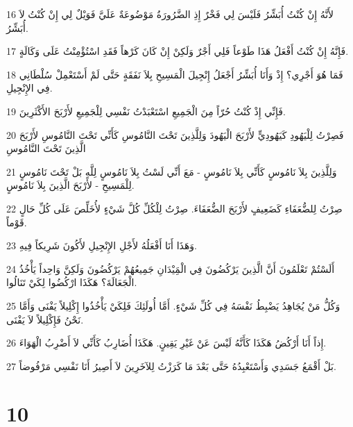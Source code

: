 \par 16 لأَنَّهُ إِنْ كُنْتُ أُبَشِّرُ فَلَيْسَ لِي فَخْرٌ إِذِ الضَّرُورَةُ مَوْضُوعَةٌ عَلَيَّ فَوَيْلٌ لِي إِنْ كُنْتُ لاَ أُبَشِّرُ.
\par 17 فَإِنَّهُ إِنْ كُنْتُ أَفْعَلُ هَذَا طَوْعاً فَلِي أَجْرٌ وَلَكِنْ إِنْ كَانَ كَرْهاً فَقَدِ اسْتُؤْمِنْتُ عَلَى وَكَالَةٍ.
\par 18 فَمَا هُوَ أَجْرِي؟ إِذْ وَأَنَا أُبَشِّرُ أَجْعَلُ إِنْجِيلَ الْمَسِيحِ بِلاَ نَفَقَةٍ حَتَّى لَمْ أَسْتَعْمِلْ سُلْطَانِي فِي الإِنْجِيلِ.
\par 19 فَإِنِّي إِذْ كُنْتُ حُرّاً مِنَ الْجَمِيعِ اسْتَعْبَدْتُ نَفْسِي لِلْجَمِيعِ لأَرْبَحَ الأَكْثَرِينَ.
\par 20 فَصِرْتُ لِلْيَهُودِ كَيَهُودِيٍّ لأَرْبَحَ الْيَهُودَ وَلِلَّذِينَ تَحْتَ النَّامُوسِ كَأَنِّي تَحْتَ النَّامُوسِ لأَرْبَحَ الَّذِينَ تَحْتَ النَّامُوسِ
\par 21 وَلِلَّذِينَ بِلاَ نَامُوسٍ كَأَنِّي بِلاَ نَامُوسٍ - مَعَ أَنِّي لَسْتُ بِلاَ نَامُوسٍ لِلَّهِ بَلْ تَحْتَ نَامُوسٍ لِلْمَسِيحِ - لأَرْبَحَ الَّذِينَ بِلاَ نَامُوسٍ.
\par 22 صِرْتُ لِلضُّعَفَاءِ كَضَعِيفٍ لأَرْبَحَ الضُّعَفَاءَ. صِرْتُ لِلْكُلِّ كُلَّ شَيْءٍ لأُخَلِّصَ عَلَى كُلِّ حَالٍ قَوْماً.
\par 23 وَهَذَا أَنَا أَفْعَلُهُ لأَجْلِ الإِنْجِيلِ لأَكُونَ شَرِيكاً فِيهِ.
\par 24 أَلَسْتُمْ تَعْلَمُونَ أَنَّ الَّذِينَ يَرْكُضُونَ فِي الْمَِيْدَانِ جَمِيعُهُمْ يَرْكُضُونَ وَلَكِنَّ وَاحِداً يَأْخُذُ الْجَعَالَةَ؟ هَكَذَا ارْكُضُوا لِكَيْ تَنَالُوا.
\par 25 وَكُلُّ مَنْ يُجَاهِدُ يَضْبِطُ نَفْسَهُ فِي كُلِّ شَيْءٍ. أَمَّا أُولَئِكَ فَلِكَيْ يَأْخُذُوا إِكْلِيلاً يَفْنَى وَأَمَّا نَحْنُ فَإِكْلِيلاً لاَ يَفْنَى.
\par 26 إِذاً أَنَا أَرْكُضُ هَكَذَا كَأَنَّهُ لَيْسَ عَنْ غَيْرِ يَقِينٍ. هَكَذَا أُضَارِبُ كَأَنِّي لاَ أَضْرِبُ الْهَوَاءَ.
\par 27 بَلْ أَقْمَعُ جَسَدِي وَأَسْتَعْبِدُهُ حَتَّى بَعْدَ مَا كَرَزْتُ لِلآخَرِينَ لاَ أَصِيرُ أَنَا نَفْسِي مَرْفُوضاً.

\chapter{10}

